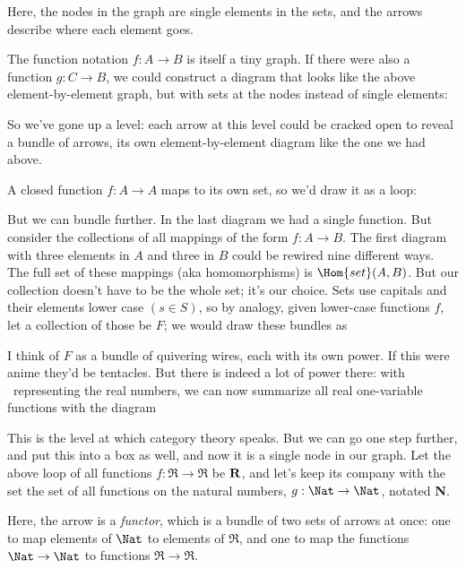\documentclass[11pt]{article}
\begin{document}
Here, the nodes in the graph are single elements in the sets, and the arrows describe
where each element goes.

The function notation $f:A\to B$ is itself a tiny graph. If there were also a function
$g:C\to B$, we could construct a diagram that looks like the above element-by-element graph, but with sets at the nodes instead of single elements:

So we've gone up a level: each arrow at this level could be cracked open to reveal
a bundle of arrows, its own element-by-element diagram like the one we had above.

A closed function $f:A\to A$ maps to its own set, so we'd draw it as a loop:


But we can bundle further. In the last diagram we had a single function. But
consider the collections of all
mappings of the form $f:A\to B$. The first diagram with three elements in $A$ and
three in $B$ could be rewired nine different ways. The full set of these mappings (aka
homomorphisms) is $\Hom{set}(A, B)$. But our collection doesn't have to be the whole set;
it's our choice. Sets use capitals and their elements lower case $(s\in S)$, so by
analogy, given lower-case functions $f$, let a collection of those be $F$; we would draw these
bundles as


I think of $F$ as a bundle of quivering wires, each with its own power. If this were anime
they'd be tentacles. But there is indeed a lot of power there: with \Re\ representing the
real numbers, we can now summarize all real one-variable functions with the diagram 

This is the level at which category theory speaks. But we can go one step further, and put
this into a box as well, and now it is a single node in our graph. Let the above loop of
all functions $f:\Re\to\Re$ be $\bf R$, and let's keep its company with the set
the set of all functions on the natural numbers, $g:\Nat\to\Nat$, notated {\bf N}.


Here, the arrow is a {\em functor}, which is a bundle of two sets of arrows at once:
one to map elements of $\Nat$ to elements of $\Re$, and one to map the functions
$\Nat\to \Nat$ to functions $\Re\to \Re$.
\end{document}
